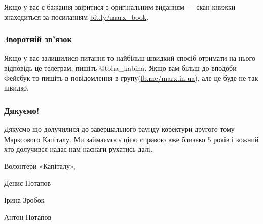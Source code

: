 \documentclass{kapital}
\begin{document}
{  \noindent{}Якщо у вас є бажання звіритися з оригінальним виданням — скан книжки
знаходиться за посиланням \underline{bit.ly/marx\_book}.

  \subsubsection*{Зворотній зв'язок}

  Якщо у вас залишилися питання то найбільш швидкий спосіб отримати на нього відповідь це телеграм, пишіть @toha_kabina. Якщо вам більш до вподоби Фейсбук то пишіть в повідомлення в групу(\underline{fb.me/marx.in.ua}), але це буде не так швидко.

  \subsubsection*{Дякуємо!}

  Дякуємо що долучилися до завершального раунду коректури другого тому Марксового Капіталу. Ми займаємось цією справою вже близько 5 років і кожний хто долучився надає нам наснаги рухатись далі.

  \bigskip{}

  \noindent{}Волонтери «Капіталу»,

  \medskip{}

  \noindent{}Денис Потапов

  \noindent{}Ірина Зробок

  \noindent{}Антон Потапов
}
\end{document}
